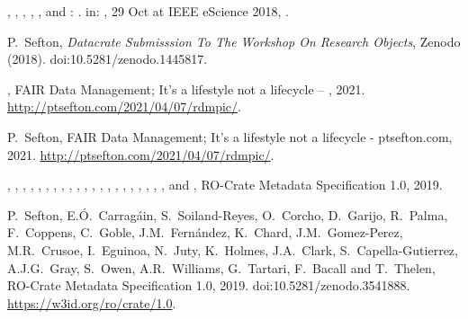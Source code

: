 \documentclass[ds,v1.1.2,openaccess]{iosart2x}%
\begin{document}
\begin{thebibliography}{}
%
\begin{bchapter}
,
,
,
,
,
 and
: 
.
in: ,
29 Oct  at
IEEE eScience 2018,
.
\end{bchapter}
%
\OrigBibText
P.~Sefton,
\textit{Datacrate Submisssion To The Workshop On Research Objects},
Zenodo
(2018).
doi:10.5281/zenodo.1445817.
\endOrigBibText
{}
\endbibitem

%
\begin{botherref}
,
{FAIR} Data Management; It's a lifestyle not a lifecycle -- ,
2021.
\url{http://ptsefton.com/2021/04/07/rdmpic/}.
\end{botherref}
%
\OrigBibText
P.~Sefton,
{FAIR} Data Management; It's a lifestyle not a lifecycle - ptsefton.com,
2021.
\url{http://ptsefton.com/2021/04/07/rdmpic/}.
\endOrigBibText
{}
\endbibitem

%
\begin{botherref}
,
,
,
,
,
,
,
,
,
,
,
,
,
,
,
,
,
,
,
,
,
 and
,
{RO}-Crate Metadata Specification 1.0,
2019.
\end{botherref}
%
\OrigBibText
P.~Sefton,
E.{\'{O}}.~Carrag\'{a}in,
S.~Soiland-Reyes,
O.~Corcho,
D.~Garijo,
R.~Palma,
F.~Coppens,
C.~Goble,
J.M.~Fern\'{a}ndez,
K.~Chard,
J.M.~Gomez-Perez,
M.R.~Crusoe,
I.~Eguinoa,
N.~Juty,
K.~Holmes,
J.A.~Clark,
S.~Capella-Gutierrez,
A.J.G.~Gray,
S.~Owen,
A.R.~Williams,
G.~Tartari,
F.~Bacall and
T.~Thelen,
{RO}-Crate Metadata Specification 1.0,
2019.
doi:10.5281/zenodo.3541888.
\url{https://w3id.org/ro/crate/1.0}.
\endOrigBibText
{}
\endbibitem


\end{thebibliography}
\end{document}
